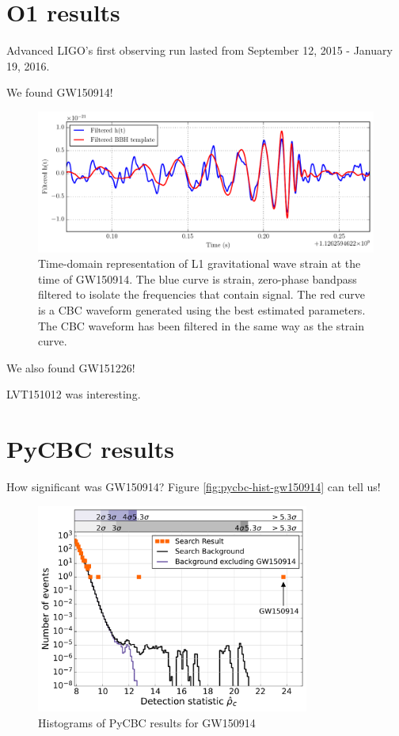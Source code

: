\section{O1 results}

Advanced LIGO's first observing run lasted from September 12, 2015 - 
January 19, 2016.  

We found GW150914!

\begin{figure}[ht!]
\includegraphics[width=\textwidth]{figures/O1/GW150914-timeseries}
\caption[GW150914 timeseries]{Time-domain representation of L1 %
        gravitational wave strain at the time of GW150914. The blue %
        curve is strain, zero-phase bandpass filtered to isolate the %
        frequencies that contain signal. The red curve is a CBC waveform %
        generated using the best estimated parameters. The CBC waveform %
        has been filtered in the same way as the strain curve.}
\end{figure}\label{fig:GW150914}

We also found GW151226!

LVT151012 was interesting.

\section{PyCBC results}

How significant was GW150914? Figure \ref{fig:pycbc-hist-gw150914} can 
tell us!

\begin{figure}[ht!]%
\includegraphics[width=0.8\textwidth]{figures/O1/pycbc_hist_GW150914}
\caption[PyCBC result histograms for GW150914]{Histograms of PyCBC results for GW150914}
\end{figure}\label{fig:pycbc-hist-gw150914}

